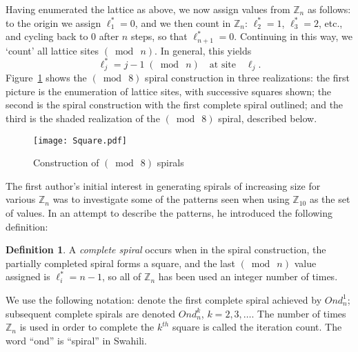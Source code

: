 \documentclass{article}
\theoremstyle{definition}
\newtheorem*{definition}{Definition}
\def\ZZ{\mathbb{Z}}
\def\pmod#1{(\bmod\  #1)}
\begin{document}
Having enumerated the lattice as above, we now assign values from
$\ZZ_n$ as follows: to the origin we assign $\ell_1^* = 0$, and we then
count in $\ZZ_n$: $\ell_2^* = 1$, $\ell_3^* = 2$, etc., and cycling back to
$0$ after $n$ steps, so that $\ell_{n+1}^* = 0$. Continuing in this way,
we `count' all lattice sites $\pmod{n}$.  In general, this yields
\[
  \ell_j^* = j-1 \;\pmod n \quad\text{at site}\quad \ell_j.
\]
Figure~\ref{fig:squares} shows the $\pmod 8$ spiral construction in
three realizations: the first picture is the enumeration of lattice
sites, with successive squares shown; the second is the spiral
construction with the first complete spiral outlined; and the third is
the shaded realization of the $\pmod 8$ spiral, described below.  

\begin{figure}[htb]
  \centering
  \texttt{[image: Square.pdf]}
  \caption{Construction of $\pmod 8$ spirals}
  \label{fig:squares}
\end{figure}

The first author's initial interest in generating spirals of
increasing size for various $\ZZ_n$ was to investigate some of the
patterns seen when using $\ZZ_{10}$ as the set of values.  In an
attempt to describe the patterns, he introduced the following
definition:

\begin{definition}%
  A \emph{complete spiral} occurs when in the spiral construction, the
  partially completed spiral forms a square, and the last $\pmod{n}$
  value assigned is $\ell^*_i = n-1$, so all of $\ZZ_n$ has been used an
  integer number of times.
\end{definition}

We use the following notation: denote the first complete spiral
achieved by $Ond^1_n$; subsequent complete spirals are denoted
$Ond^k_n$, $k = 2,3,\dots$.  The number of times $\ZZ_n$ is used in
order to complete the $k^{th}$ square is called the iteration count.
The word ``ond'' is ``spiral'' in Swahili.
\end{document}
